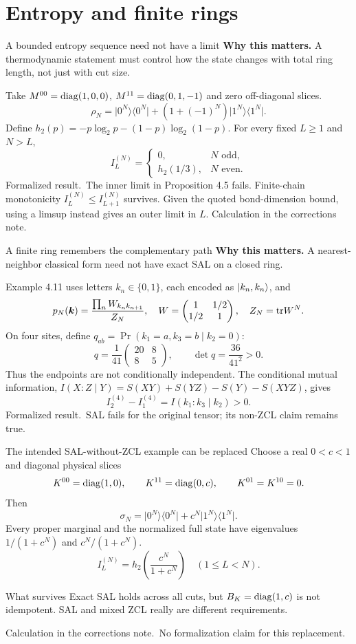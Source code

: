 \documentclass[aspectratio=169,14pt]{beamer}
\newcommand{\kb}[2]{\lvert#1\rangle\langle#2\rvert}
\newcommand{\why}[1]{\textcolor{amber}{\textbf{Why this matters.}} #1\par\medskip}
\newcommand{\verified}{\textcolor{mintgreen}{Formalized result.}}
\newcommand{\calculated}{\textcolor{amber}{Calculation in the corrections note.}}
\begin{document}
\section{Entropy and finite rings}
\begin{frame}{A bounded entropy sequence need not have a limit}
\why{A thermodynamic statement must control how the state changes with total ring length, not just with cut size.}
Take $M^{00}=\mathrm{diag}(1,0,0)$, $M^{11}=\mathrm{diag}(0,1,-1)$ and zero off-diagonal slices.
\[
 \rho_N=\kb{0^N}{0^N}+(1+(-1)^N)\kb{1^N}{1^N}.
\]
Define $h_2(p)=-p\log_2p-(1-p)\log_2(1-p)$. For every fixed $L\geq1$ and $N>L$,
\[
 I_L^{(N)}=\begin{cases}0,&N\text{ odd},\\h_2(1/3),&N\text{ even}.\end{cases}
\]
\verified\ The inner limit in Proposition 4.5 fails.
Finite-chain monotonicity $I_L^{(N)}\leq I_{L+1}^{(N)}$ survives. Given the quoted bond-dimension bound, using a limsup instead gives an outer limit in $L$. \calculated
\end{frame}
\begin{frame}{A finite ring remembers the complementary path}
\why{A nearest-neighbor classical form need not have exact SAL on a closed ring.}
Example 4.11 uses letters $k_n\in\{0,1\}$, each encoded as $\ket{k_n,k_n}$, and
\[
 p_N(\boldsymbol k)=\frac{\prod_nW_{k_nk_{n+1}}}{Z_N},\quad
 W=\begin{pmatrix}1&1/2\\1/2&1\end{pmatrix},\quad Z_N=\mathrm{tr} W^N.
\]
On four sites, define $q_{ab}=\Pr(k_1=a,k_3=b\mid k_2=0)$:
\[
 q=\frac1{41}\begin{pmatrix}20&8\\8&5\end{pmatrix},\qquad\det q=\frac{36}{41^2}>0.
\]
Thus the endpoints are not conditionally independent. The conditional mutual information, $I(X:Z\mid Y)=S(XY)+S(YZ)-S(Y)-S(XYZ)$, gives
\[
 I_2^{(4)}-I_1^{(4)}=I(k_1:k_3\mid k_2)>0.
\]
\verified\ SAL fails for the original tensor; its non-ZCL claim remains true.
\end{frame}
\begin{frame}{The intended SAL-without-ZCL example can be replaced}
Choose a real $0<c<1$ and diagonal physical slices
\[
 K^{00}=\mathrm{diag}(1,0),\qquad K^{11}=\mathrm{diag}(0,c),\qquad K^{01}=K^{10}=0.
\]
Then
\[
 \sigma_N=\kb{0^N}{0^N}+c^N\kb{1^N}{1^N}.
\]
Every proper marginal and the normalized full state have eigenvalues $1/(1+c^N)$ and $c^N/(1+c^N)$.
\[
 I_L^{(N)}=h_2\!\left(\frac{c^N}{1+c^N}\right)\quad(1\leq L<N).
\]
\begin{block}{What survives}
Exact SAL holds across all cuts, but $B_K=\mathrm{diag}(1,c)$ is not idempotent. SAL and mixed ZCL really are different requirements.
\end{block}
\calculated\ No formalization claim for this replacement.
\end{frame}
\end{document}
